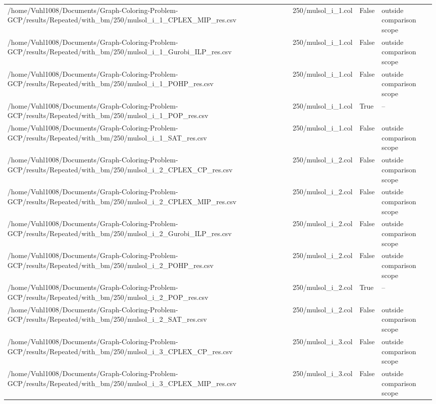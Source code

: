 \begin{table}[htbp]
\begin{tabular}{llll}
/home/Vuhl1008/Documents/Graph-Coloring-Problem-GCP/results/Repeated/with\_bm/250/mulsol\_i\_1\_CPLEX\_MIP\_res.csv & 250/mulsol\_i\_1.col & False & outside comparison scope \\
/home/Vuhl1008/Documents/Graph-Coloring-Problem-GCP/results/Repeated/with\_bm/250/mulsol\_i\_1\_Gurobi\_ILP\_res.csv & 250/mulsol\_i\_1.col & False & outside comparison scope \\
/home/Vuhl1008/Documents/Graph-Coloring-Problem-GCP/results/Repeated/with\_bm/250/mulsol\_i\_1\_POHP\_res.csv & 250/mulsol\_i\_1.col & False & outside comparison scope \\
/home/Vuhl1008/Documents/Graph-Coloring-Problem-GCP/results/Repeated/with\_bm/250/mulsol\_i\_1\_POP\_res.csv & 250/mulsol\_i\_1.col & True & -- \\
/home/Vuhl1008/Documents/Graph-Coloring-Problem-GCP/results/Repeated/with\_bm/250/mulsol\_i\_1\_SAT\_res.csv & 250/mulsol\_i\_1.col & False & outside comparison scope \\
/home/Vuhl1008/Documents/Graph-Coloring-Problem-GCP/results/Repeated/with\_bm/250/mulsol\_i\_2\_CPLEX\_CP\_res.csv & 250/mulsol\_i\_2.col & False & outside comparison scope \\
/home/Vuhl1008/Documents/Graph-Coloring-Problem-GCP/results/Repeated/with\_bm/250/mulsol\_i\_2\_CPLEX\_MIP\_res.csv & 250/mulsol\_i\_2.col & False & outside comparison scope \\
/home/Vuhl1008/Documents/Graph-Coloring-Problem-GCP/results/Repeated/with\_bm/250/mulsol\_i\_2\_Gurobi\_ILP\_res.csv & 250/mulsol\_i\_2.col & False & outside comparison scope \\
/home/Vuhl1008/Documents/Graph-Coloring-Problem-GCP/results/Repeated/with\_bm/250/mulsol\_i\_2\_POHP\_res.csv & 250/mulsol\_i\_2.col & False & outside comparison scope \\
/home/Vuhl1008/Documents/Graph-Coloring-Problem-GCP/results/Repeated/with\_bm/250/mulsol\_i\_2\_POP\_res.csv & 250/mulsol\_i\_2.col & True & -- \\
/home/Vuhl1008/Documents/Graph-Coloring-Problem-GCP/results/Repeated/with\_bm/250/mulsol\_i\_2\_SAT\_res.csv & 250/mulsol\_i\_2.col & False & outside comparison scope \\
/home/Vuhl1008/Documents/Graph-Coloring-Problem-GCP/results/Repeated/with\_bm/250/mulsol\_i\_3\_CPLEX\_CP\_res.csv & 250/mulsol\_i\_3.col & False & outside comparison scope \\
/home/Vuhl1008/Documents/Graph-Coloring-Problem-GCP/results/Repeated/with\_bm/250/mulsol\_i\_3\_CPLEX\_MIP\_res.csv & 250/mulsol\_i\_3.col & False & outside comparison scope \\

\end{tabular}
\end{table}
